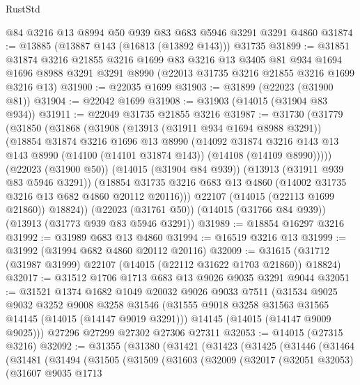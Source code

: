 \begin{lexlean}{RustStd}
\begin{coremodule}
    @84
    @3216
    @13
    @8994
    @50
    @939
    @83
    @683
    @5946
    @3291
    @3291
    @4860
@31874 := @13885 (@13887 @143 (@16813 (@13892 @143))) @31735
@31899 := @31851
    @31874
    @3216
    @21855
    @3216
    @1699
    @83
    @3216
    @13
    @3405
    @81
    @934
    @1694
    @1696
    @8988
    @3291
    @3291
    @8990
    (@22013 @31735 @3216 @21855 @3216 @1699 @3216 @13)
@31900 := @22035 @1699
@31903 := @31899 (@22023 (@31900 @81))
@31904 := @22042 @1699
@31908 := @31903 (@14015 (@31904 @83 @934))
@31911 := @22049 @31735 @21855 @3216
@31987 := @31730
    (@31779
      (@31850
        (@31868
          (@31908
            (@13913 (@31911 @934 @1694 @8988 @3291))
            (@18854
              @31874
              @3216
              @1696
              @13
              @8990
              (@14092
                @31874
                @3216
                @143
                @13
                @143
                @8990
                (@14100 (@14101 @31874 @143))
                (@14108 (@14109 @8990)))))
          (@22023 (@31900 @50))
          (@14015 (@31904 @84 @939))
          (@13913 (@31911 @939 @83 @5946 @3291))
          (@18854 @31735 @3216 @683 @13 @4860 (@14002 @31735 @3216 @13 @682 @4860 @20112 @20116)))
        @22107
        (@14015 (@22113 @1699 @21860))
        @18824))
    (@22023 (@31761 @50))
    (@14015 (@31766 @84 @939))
    (@13913 (@31773 @939 @83 @5946 @3291))
@31989 := @18854 @16297 @3216
@31992 := @31989 @683 @13 @4860
@31994 := @16519 @3216 @13
@31999 := @31992 (@31994 @682 @4860 @20112 @20116)
@32009 := @31615 (@31712 (@31987 @31999) @22107 (@14015 (@22112 @31622 @1703 @21860)) @18824)
@32017 := @31512 @1706 @1713 @683 @13 @9026 @9035 @3291 @9044
@32051 := @31521
    @1374
    @1682
    @1049
    @20032
    @9026
    @9033
    @7511
    (@31534
      @9025
      @9032
      @3252
      @9008
      @3258
      @31546
      (@31555 @9018 @3258 @31563 @31565 @14145 (@14015 (@14147 @9019 @3291)))
      @14145
      (@14015 (@14147 @9009 @9025)))
    @27296
    @27299
    @27302
    @27306
    @27311
@32053 := @14015 (@27315 @3216)
@32092 := @31355
    (@31380
      (@31421
        (@31423
          (@31425
            (@31446
              (@31464
                (@31481
                  (@31494
                    (@31505
                      (@31509
                        (@31603
                          (@32009
                            (@32017
                              (@32051 @32053)
                              (@31607
                                @9035
                                @1713

\end{coremodule}
\end{lexlean}
